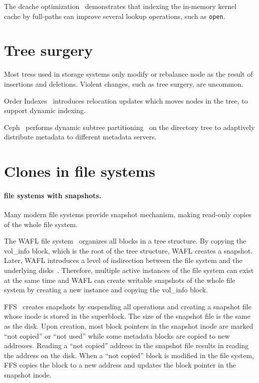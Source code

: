 The dcache optimization~\citep{dcache} demonstrates that indexing the in-memory
kernel cache by full-paths can improve several lookup operations, such as
\texttt{open}.

\section{Tree surgery}

Most tress used in storage systems only modify or rebalance node as the result
of insertions and deletions.
Violent changes, such as tree surgery, are uncommon.

Order Indexes~\citep{orderindex} introduces relocation updates which moves nodes
in the tree, to support dynamic indexing.

Ceph~\citep{ceph} performs dynamic subtree partitioning~\citep{cephtree} on the
directory tree to adaptively distribute metadata to different metadata servers.

\section{Clones in file systems}

\paragraph{file systems with snapshots.}

Many modern file systems provide snapshot mechanism, making read-only copies of
the whole file system.

The WAFL file system~\cite{wafl} organizes all blocks in a tree structure.
By copying the vol\_info block, which is the root of the tree structure, WAFL
creates a snapshot.
Later, WAFL introduces a level of indirection between the file system and the
underlying disks~\cite{wafl-flexvol}.
Therefore, multiple active instances of the file system can exist at the same
time and WAFL can create writable snapshots of the whole file system by creating
a new instance and copying the vol\_info block.

FFS~\cite{ffs} creates snapshots by suspending all operations and creating a
snapshot file whose inode is stored in the superblock.
The size of the snapshot file is the same as the disk.
Upon creation, most block pointers in the snapshot inode are marked
``not copied'' or ``not used'' while some metadata blocks are copied to new
addresses.
Reading a ``not copied'' address in the snapshot file results in reading the
address on the disk.
When a ``not copied'' block is modified in the file system, FFS copies the block
to a new address and updates the block pointer in the snapshot inode.

